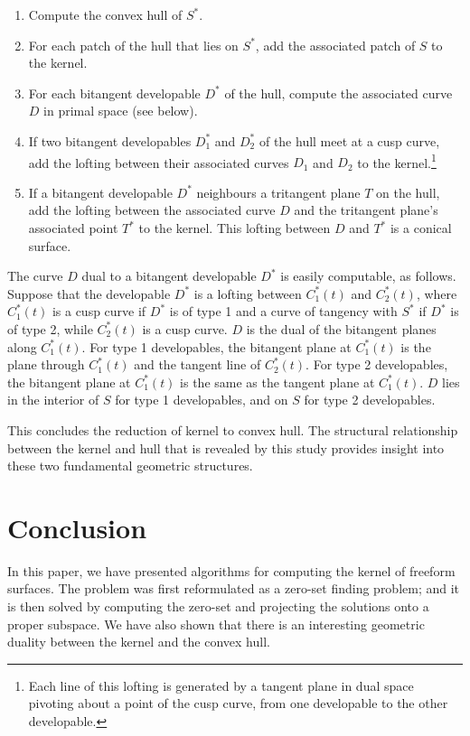\documentclass{acmsiggraph}
\begin{document}
\begin{enumerate}
\item Compute the convex hull of $S^*$.
\item For each patch of the hull that lies on $S^*$, add the associated patch of $S$
	to the kernel.
\item For each bitangent developable $D^*$ of the hull, compute the associated curve $D$ in primal space
  (see below).
\item If two bitangent developables $D_1^*$ and $D_2^*$ of the hull meet at a cusp curve, 
  add the lofting between their associated curves $D_1$ and $D_2$ to the kernel.\footnote{
    Each line of this lofting is generated by a tangent plane in dual space pivoting 
    about a point of the cusp curve, from one developable to the other developable.}
\item If a bitangent developable $D^*$ neighbours a tritangent plane $T$ on the hull,
add the lofting between the associated curve $D$ and the tritangent plane's
associated point $T^*$ to the kernel.  This lofting between $D$ and 
$T^*$ is a conical surface.
\end{enumerate}

The curve $D$ dual to a bitangent developable $D^*$ is easily
computable, as follows.
Suppose that the developable $D^*$ is a lofting between $C^*_1(t)$ and $C^*_2(t)$,
where $C^*_1(t)$ is a cusp curve if $D^*$ is of type 1 and
a curve of tangency with $S^*$ if $D^*$ is of type 2,
while $C^*_2(t)$ is a cusp curve.
$D$ is the dual of the bitangent planes along $C^*_1(t)$.
For type 1 developables, the bitangent plane at $C^*_1(t)$ is the plane through
$C^*_1(t)$ and the tangent line of $C^*_2(t)$.
For type 2 developables, the bitangent plane at $C^*_1(t)$ is the same as the tangent plane
at $C^*_1(t)$.
$D$ lies in the interior of $S$ for type 1 developables,
and on $S$ for type 2 developables.

This concludes the reduction of kernel to convex hull.
The structural relationship between the kernel and hull that is revealed
by this study provides insight into these two fundamental geometric structures.

\section{Conclusion}
\label{sec-conclusion}
In this paper, we have presented algorithms for computing
the kernel of freeform surfaces.
The problem was first reformulated as a zero-set finding problem;
and it is then solved by computing the zero-set and
projecting the solutions onto a proper subspace.
We have also shown that there is an interesting geometric duality
between the kernel and the convex hull.
\end{document}
